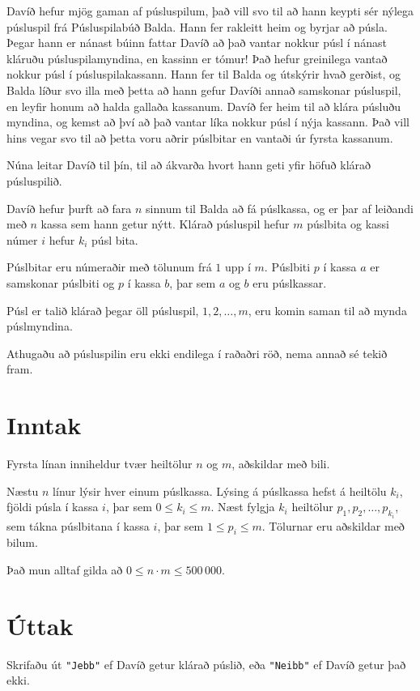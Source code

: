 
Davíð hefur mjög gaman af púsluspilum, það vill svo til að hann keypti sér nýlega púsluspil frá Púsluspilabúð Balda.
Hann fer rakleitt heim og byrjar að púsla.
Þegar hann er nánast búinn fattar Davíð að það vantar nokkur púsl í nánast kláruðu púsluspilamyndina, en kassinn er tómur!
Það hefur greinilega vantað nokkur púsl í púsluspilakassann.
Hann fer til Balda og útskýrir hvað gerðist, og Balda líður svo illa með þetta að hann gefur Davíði annað samskonar púsluspil, en leyfir honum að halda gallaða kassanum.
Davíð fer heim til að klára púsluðu myndina, og kemst að því að það vantar líka nokkur púsl í nýja kassann. Það vill hins vegar svo til að þetta voru aðrir púslbitar en vantaði úr fyrsta kassanum.

Núna leitar Davíð til þín, til að ákvarða hvort hann geti yfir höfuð klárað púsluspilið.

Davíð hefur þurft að fara $n$ sinnum til Balda að fá púslkassa, og er þar af leiðandi með $n$ kassa sem hann getur nýtt.
Klárað púsluspil hefur $m$ púslbita og kassi númer $i$ hefur $k_i$ púsl bita.

Púslbitar eru númeraðir með tölunum frá $1$ upp í $m$. Púslbiti $p$ í kassa $a$ er samskonar púslbiti og $p$ í kassa $b$, þar sem $a$ og $b$ eru púslkassar.

Púsl er talið klárað þegar öll púsluspil, $1, 2, \ldots, m$, eru komin saman til að mynda púslmyndina.

Athugaðu að púsluspilin eru ekki endilega í raðaðri röð, nema annað sé tekið fram.

\section*{Inntak}
Fyrsta línan inniheldur tvær heiltölur $n$ og $m$, aðskildar með bili.

Næstu $n$ línur lýsir hver einum púslkassa.
Lýsing á púslkassa hefst á heiltölu $k_i$, fjöldi púsla í kassa $i$, þar sem $0 \leq k_i \leq m$. Næst fylgja $k_i$ heiltölur $p_1, p_2, \ldots, p_{k_i}$, sem tákna púslbitana í kassa $i$, þar sem $1 \leq p_i \leq m$.
Tölurnar eru aðskildar með bilum.

Það mun alltaf gilda að $0 \leq n \cdot m \leq 500\,000$.

\section*{Úttak}
Skrifaðu út \texttt{"Jebb"} ef Davíð getur klárað púslið, eða \texttt{"Neibb"} ef Davíð getur það ekki.

